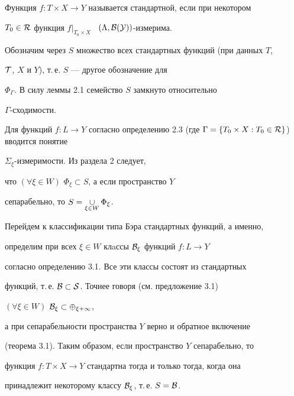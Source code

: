  


\begin{defns} 


Функция $f:T\times X\to Y$ называется стандартной, если при некотором 


$T_0\in\cal R$ функция $f|_{T_0\times X}$ \ $(\Lambda,\cal 


B(Y))$-измерима. 


\end{defns} 


 


Обозначим через $S$ множество всех стандартных функций (при данных $T$, 


$\cal T$, $X$ и $Y$), т.\,е. $S$ --- другое обозначение для 


$\Phi_\Gamma$. В силу леммы 2.1 семейство $S$ замкнуто относительно 


$\Gamma$-сходимости. 


 


Для функций $f:L\to Y$ согласно определению 2.3 (где $\Gamma= 


\{T_0\times X:T_0\in\cal R\}$) вводится понятие 


$\Sigma_\xi$-измеримости. Из раздела 2 следует, 


что $(\forall \xi\in W)$ $\Phi_\xi\subset S$, а если пространство $Y$ 


сепарабельно, то $S=\mathop{\cup}\limits_{\xi\in W}\Phi_\xi$. 


 


Перейдем к классификации типа Бэра стандартных функций, а именно, 


определим при всех $\xi\in W$ клaссы $\cal B_\xi$ функций $f:L\to Y$ 


согласно определению 3.1. Все эти классы состоят из стандартных 


функций, т.\,е. $\cal B\subset S$. Точнее говоря (см. предложение 3.1) 


$(\forall \xi\in W)$ $\cal B_\xi\subset\Phi_{\xi+1}$, 


а при сепарабельности пространства $Y$ верно и обратное включение 


(теорема 3.1). Таким образом, если пространство $Y$ сепарабельно, то 


функция $f:T\times X\to Y$ стандартна тогда и только тогда, когда она 


принадлежит некоторому классу $\cal B_\xi$, т.\,е. $S=\cal B$. 


